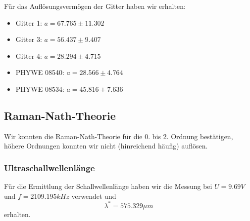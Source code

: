 Für das Auflösungsvermögen der Gitter haben wir erhalten:

\begin{itemize}
\item Gitter 1: $ a = 67.765 \pm 11.302 $
\item Gitter 3: $ a = 56.437 \pm 9.407 $
\item Gitter 4: $ a = 28.294 \pm 4.715 $
\item PHYWE 08540: $ a = 28.566 \pm 4.764 $
\item PHYWE 08534: $ a = 45.816 \pm 7.636 $
\end{itemize}


\subsection{Raman-Nath-Theorie}

Wir konnten die Raman-Nath-Theorie für die 0. bis 2. Ordnung bestätigen, höhere Ordnungen konnten wir nicht (hinreichend häufig) auflösen.

\subsubsection{Ultraschallwellenlänge}

Für die Ermittlung der Schallwellenlänge haben wir die Messung bei $ U = 9.69 V$ und $f = 2109.195 kHz $ verwendet und  
$$\boxed{ \lambda^* = 575.329 \mu m}$$
erhalten.
